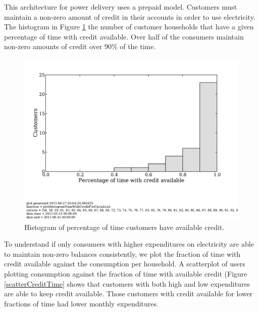 \documentclass[conference]{IEEEtran}
\begin{document}

This architecture for power delivery uses a prepaid model.  
Customers must maintain a non-zero amount of credit in their accounts in order
to use electricity.
The histogram in Figure \ref{creditHistogram} the number of customer households
that have a given percentage of time with credit available.  
Over half of the consumers maintain non-zero amounts of credit over 90\% of 
the time.


\begin{figure}[]
\begin{center}
\includegraphics[trim = 0in 1.3in 0in 0in, clip, width=\columnwidth]
                {figures/creditHistogram.pdf}
\end{center}
\caption{Histogram of percentage of time customers have available credit.}
\label{creditHistogram}
\end{figure}

To understand if only consumers with higher expenditures on electricity 
are able to maintain non-zero balances consistently, we plot the fraction of 
time with credit available against the consumption per household.
A scatterplot of users plotting consumption against the fraction of time with
available credit (Figure \ref{scatterCreditTime}
shows that customers with both high and low expenditures are able
to keep credit available.
Those customers with credit available for lower fractions of time had lower 
monthly expenditures.
\end{document}
